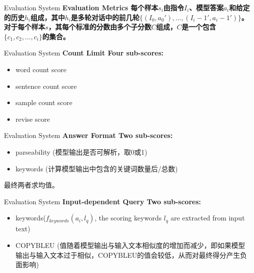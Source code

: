 \documentclass{beamer}
\begin{document}
\begin{frame}{Evaluation System}
    \large\bfseries{Evaluation Metrics}
    \newline
    \normalfont
    每个样本$s_i$由指令$I_i$、模型答案$a_i$和给定的历史$h_i$组成，其中$h_i$是多轮对话中的前几轮$\{(I_0, a_0'), ..., (I_i−1', a_i−1')\}$。对于每个样本$s$，其每个标准的分数由多个子分数$C$组成，$C$是一个包含$\{c_1, c_2, ..., c_i\}$的集合。
\end{frame}

\begin{frame}{Evaluation System}
    \large\bfseries{Count Limit}
    \newline
    \normalfont
    Four sub-scores:
    \begin{itemize}
        \item {word count score}
        \item {sentence count score}
        \item {sample count score}
        \item {revise score}
    \end{itemize}
\end{frame}

\begin{frame}{Evaluation System}
    \large\bfseries{Answer Format}
    \newline
    \normalfont
    Two sub-scores:
    \begin{itemize}
        \item {parseability (模型输出是否可解析，取0或1)}
        \item {keywords (计算模型输出中包含的关键词数量后/总数)}
    \end{itemize}
    最终两者求均值。
\end{frame}

\begin{frame}{Evaluation System}
    \large\bfseries{Input-dependent Query}
    \newline
    \normalfont
    Two sub-scores:
    \begin{itemize}
        \item {keywords($f_{keywords}(a_i, l_q)$, the scoring keywords $l_q$ are extracted from input text)}
        \item {COPYBLEU (值随着模型输出与输入文本相似度的增加而减少，即如果模型输出与输入文本过于相似，COPYBLEU的值会较低，从而对最终得分产生负面影响)}
    \end{itemize}
\end{frame}
\end{document}
